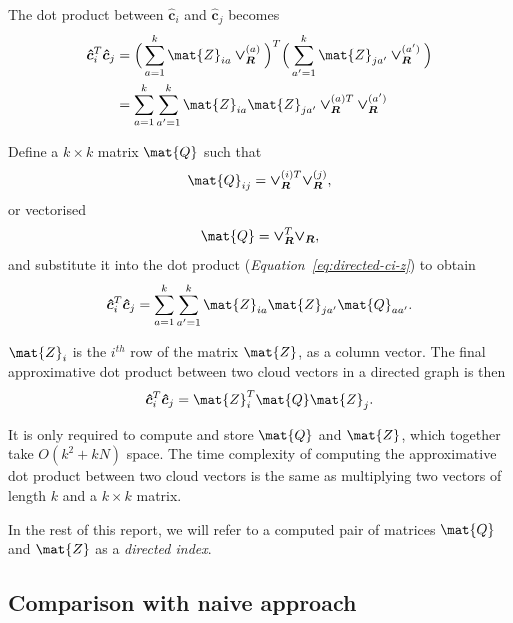 \documentclass[12pt]{report}
\begin{document}
The dot product between $\bm{\hat{c}}_i$ and $\bm{\hat{c}}_j$ becomes
\begin{align}
  \bm{\hat{c}}_i^T \bm{\hat{c}}_j &=
        \Big( \sum_{a=1}^k \mat{Z}_{ia} \bm{\vee_R}^{(a)} \Big)^T
        \Big( \sum_{a'=1}^k \mat{Z}_{ja'} \bm{\vee_R}^{(a')} \Big) \\
  \label{eq:directed-ci-z}
  &= \sum_{a=1}^k \sum_{a'=1}^k \mat{Z}_{ia} \mat{Z}_{ja'}
        \bm{\vee_R}^{(a)T} \bm{\vee_R}^{(a')}
\end{align}

%
%

Define a $k \times k$ matrix $\mat{Q}$ such that
\begin{equation}
  \mat{Q}_{ij} = \bm{\vee_R}^{(i)T} \bm{\vee_R}^{(j)},
\end{equation}
or vectorised
\begin{equation}
  \mat{Q} = \bm{\vee_R}^T \bm{\vee_R},
\end{equation}
and substitute it into the dot product (\emph{Equation~\ref{eq:directed-ci-z}})
to obtain
\begin{equation}
  \bm{\hat{c}}_i^T \bm{\hat{c}}_j = \sum_{a=1}^k \sum_{a'=1}^k
    \mat{Z}_{ia} \mat{Z}_{ja'} \mat{Q}_{aa'}.
\end{equation}

$\mat{Z}_i$ is the $i^{th}$ row of the matrix $\mat{Z}$, as a column vector.
The final approximative dot product between two cloud vectors in a directed
graph is then
\begin{equation}
  \bm{\hat{c}}_i^T \bm{\hat{c}}_j = \mat{Z}_i^T \mat{Q} \mat{Z}_j.
\end{equation}


It is only required to compute and store $\mat{Q}$ and $\mat{Z}$, which together
take $O(k^2+kN)$ space. The time complexity of computing the approximative dot
product between two cloud vectors is the same as multiplying two vectors of
length $k$ and a $k \times k$ matrix.

In the rest of this report, we will refer to a computed pair of matrices
$\mat{Q}$ and $\mat{Z}$ as a \emph{directed index}.

%
%

\subsection{Comparison with naive approach}
\end{document}
